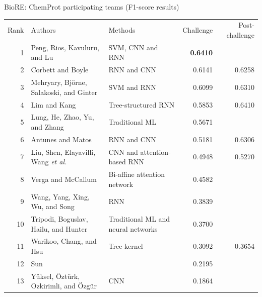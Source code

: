 \begin{frame}[t]{BioRE: ChemProt participating teams (F1-score results)}

\centering
\tiny


\renewcommand*{\arraystretch}{1.3}
\begin{tabular}{rllrr}
Rank & Authors & Methods & Challenge & Post-challenge\\
\cmidrule{1-5}
1 & Peng, Rios, Kavuluru, and Lu & SVM, CNN and RNN & \textbf{0.6410}\\
2 & Corbett and Boyle & RNN and CNN & 0.6141 & 0.6258\\
3 & Mehryary, Björne, Salakoski, and Ginter & SVM and RNN & 0.6099 & 0.6310\\
4 & Lim and Kang & Tree-structured RNN & 0.5853 & 0.6410\\
5 & Lung, He, Zhao, Yu, and Zhang & Traditional ML & 0.5671 &\\
\alert{6} & \alert{Antunes and Matos} & \alert{RNN and CNN} & \alert{0.5181} & \alert{0.6306}\\
7 & Liu, Shen, Elayavilli, Wang \textit{et al.} & CNN and attention-based RNN & 0.4948 & 0.5270\\
8 & Verga and McCallum & Bi-affine attention network & 0.4582 &\\
9 & Wang, Yang, Xing, Wu, and Song & RNN & 0.3839 &\\
10 & Tripodi, Boguslav, Hailu, and Hunter & Traditional ML and neural networks & 0.3700 &\\
11 & Warikoo, Chang, and Hsu & Tree kernel & 0.3092 & 0.3654\\
12 & Sun & & 0.2195 &\\
13 & Yüksel, Öztürk, Ozkirimli, and Özgür & CNN & 0.1864 &\\
\end{tabular}

\end{frame}
